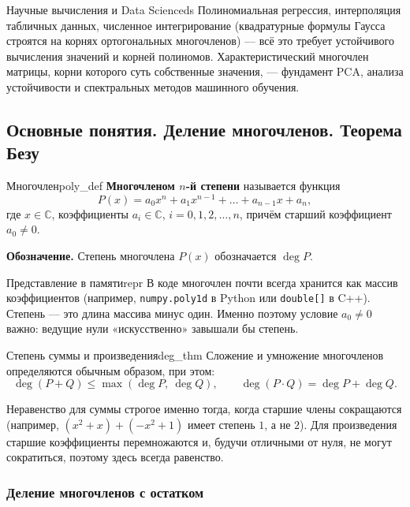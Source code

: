 \documentclass[12pt,a4paper]{article}
\begin{document}
\begin{remarkIT}{Научные вычисления и Data Science}{ds}
  Полиномиальная регрессия, интерполяция табличных данных, численное
  интегрирование (квадратурные формулы Гаусса строятся на корнях
  ортогональных многочленов) — всё это требует устойчивого вычисления
  значений и корней полиномов. Характеристический многочлен матрицы,
  корни которого суть собственные значения, — фундамент PCA, анализа
  устойчивости и спектральных методов машинного обучения.
\end{remarkIT}

\subsection*{Основные понятия. Деление многочленов. Теорема Безу}

\begin{definition}{Многочлен}{poly_def}
  \textbf{Многочленом $n$-й степени} называется функция
  \[
    P(x) = a_0 x^n + a_1 x^{n-1} + \dots + a_{n-1} x + a_n,
  \]
  где $x \in \mathbb{C}$, коэффициенты $a_i \in \mathbb{C}$,
  $i = 0, 1, 2, \dots, n$, причём старший коэффициент $a_0 \neq 0$.
\end{definition}

\noindent\textbf{Обозначение.} Степень многочлена $P(x)$ обозначается
$\deg P$.

\begin{remarkIT}{Представление в памяти}{repr}
  В коде многочлен почти всегда хранится как массив коэффициентов
  (например, \texttt{numpy.poly1d} в Python или \texttt{double[]} в
  C++). Степень — это длина массива минус один. Именно поэтому условие
  $a_0 \neq 0$ важно: ведущие нули «искусственно» завышали бы степень.
\end{remarkIT}

\begin{theorem}{Степень суммы и произведения}{deg_thm}
  Сложение и умножение многочленов определяются обычным образом, при
  этом:
  \[
    \deg(P + Q) \le \max(\deg P,\ \deg Q), \qquad
    \deg(P \cdot Q) = \deg P + \deg Q.
  \]
\end{theorem}

\noindent Неравенство для суммы строгое именно тогда, когда старшие
члены сокращаются (например, $(x^2 + x) + (-x^2 + 1)$ имеет степень
$1$, а не $2$). Для произведения старшие коэффициенты перемножаются и,
будучи отличными от нуля, не могут сократиться, поэтому здесь всегда
равенство.

\subsubsection*{Деление многочленов с остатком}
\end{document}
